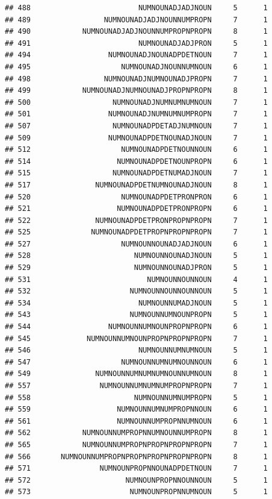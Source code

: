 \documentclass[]{article}
\begin{document}
\begin{verbatim}
## 488                         NUMNOUNADJADJNOUN     5      1
## 489                 NUMNOUNADJADJNOUNNUMPROPN     7      1
## 490            NUMNOUNADJADJNOUNNUMPROPNPROPN     8      1
## 491                         NUMNOUNADJADJPRON     5      1
## 494                  NUMNOUNADJNOUNADPDETNOUN     7      1
## 495                     NUMNOUNADJNOUNNUMNOUN     6      1
## 498                 NUMNOUNADJNUMNOUNADJPROPN     7      1
## 499            NUMNOUNADJNUMNOUNADJPROPNPROPN     8      1
## 500                   NUMNOUNADJNUMNUMNUMNOUN     7      1
## 501                  NUMNOUNADJNUMNUMNUMPROPN     7      1
## 507                   NUMNOUNADPDETADJNUMNOUN     7      1
## 509                  NUMNOUNADPDETNOUNADJNOUN     7      1
## 512                     NUMNOUNADPDETNOUNNOUN     6      1
## 514                    NUMNOUNADPDETNOUNPROPN     6      1
## 515                   NUMNOUNADPDETNUMADJNOUN     7      1
## 517               NUMNOUNADPDETNUMNOUNADJNOUN     8      1
## 520                     NUMNOUNADPDETPRONPRON     6      1
## 521                    NUMNOUNADPDETPRONPROPN     6      1
## 522               NUMNOUNADPDETPRONPROPNPROPN     7      1
## 525              NUMNOUNADPDETPROPNPROPNPROPN     7      1
## 527                     NUMNOUNNOUNADJADJNOUN     6      1
## 528                        NUMNOUNNOUNADJNOUN     5      1
## 529                        NUMNOUNNOUNADJPRON     5      1
## 531                           NUMNOUNNOUNNOUN     4      1
## 532                       NUMNOUNNOUNNOUNNOUN     5      1
## 534                         NUMNOUNNUMADJNOUN     5      1
## 543                       NUMNOUNNUMNOUNPROPN     5      1
## 544                  NUMNOUNNUMNOUNPROPNPROPN     6      1
## 545             NUMNOUNNUMNOUNPROPNPROPNPROPN     7      1
## 546                         NUMNOUNNUMNUMNOUN     5      1
## 547                     NUMNOUNNUMNUMNOUNNOUN     6      1
## 549               NUMNOUNNUMNUMNUMNOUNNUMNOUN     8      1
## 557                NUMNOUNNUMNUMNUMPROPNPROPN     7      1
## 558                        NUMNOUNNUMNUMPROPN     5      1
## 559                    NUMNOUNNUMNUMPROPNNOUN     6      1
## 561                    NUMNOUNNUMPROPNNUMNOUN     6      1
## 562            NUMNOUNNUMPROPNNUMNOUNNUMPROPN     8      1
## 565            NUMNOUNNUMPROPNPROPNPROPNPROPN     7      1
## 566       NUMNOUNNUMPROPNPROPNPROPNPROPNPROPN     8      1
## 571                NUMNOUNPROPNNOUNADPDETNOUN     7      1
## 572                      NUMNOUNPROPNNOUNNOUN     5      1
## 573                       NUMNOUNPROPNNUMNOUN     5      1

\end{verbatim}
\end{document}
